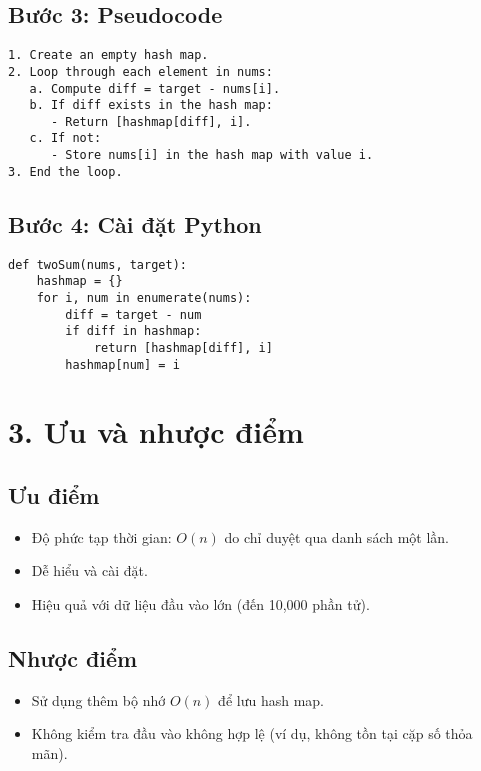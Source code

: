 \documentclass[a4paper,12pt]{article}
\begin{document}
\subsection*{Bước 3: Pseudocode}
\begin{lstlisting}[caption={Pseudocode for Two Sum}]
1. Create an empty hash map.
2. Loop through each element in nums:
   a. Compute diff = target - nums[i].
   b. If diff exists in the hash map:
      - Return [hashmap[diff], i].
   c. If not:
      - Store nums[i] in the hash map with value i.
3. End the loop.
\end{lstlisting}

\subsection*{Bước 4: Cài đặt Python}
\begin{lstlisting}[caption={Python Implementation of Two Sum}]
def twoSum(nums, target):
    hashmap = {}
    for i, num in enumerate(nums):
        diff = target - num
        if diff in hashmap:
            return [hashmap[diff], i]
        hashmap[num] = i
\end{lstlisting}

\section*{3. Ưu và nhược điểm}

\subsection*{Ưu điểm}
\begin{itemize}
    \item Độ phức tạp thời gian: \(O(n)\) do chỉ duyệt qua danh sách một lần.
    \item Dễ hiểu và cài đặt.
    \item Hiệu quả với dữ liệu đầu vào lớn (đến 10,000 phần tử).
\end{itemize}

\subsection*{Nhược điểm}
\begin{itemize}
    \item Sử dụng thêm bộ nhớ \(O(n)\) để lưu hash map.
    \item Không kiểm tra đầu vào không hợp lệ (ví dụ, không tồn tại cặp số thỏa mãn).
\end{itemize}
\end{document}

